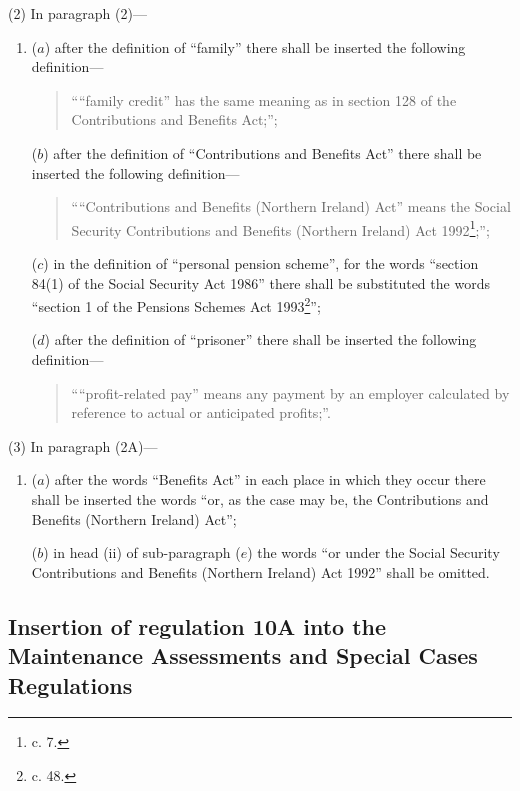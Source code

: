 \documentclass[12pt,a4paper]{article}
\begin{document}
(2) In paragraph (2)—
\begin{enumerate}\item[]
($a$) after the definition of “family” there shall be inserted the following definition—
\begin{quotation}
““family credit” has the same meaning as in section 128 of the Contributions and Benefits Act;”;
\end{quotation}

($b$) after the definition of “Contributions and Benefits Act” there shall be inserted the following definition—
\begin{quotation}
\begin{sloppypar}
““Contributions and Benefits (Northern Ireland) Act” means the Social Security Contributions and Benefits (Northern Ireland) Act 1992\footnote{ c. 7.};”;
\end{sloppypar}
\end{quotation}

($c$) in the definition of “personal pension scheme”, for the words “section 84(1) of the Social Security Act 1986” there shall be substituted the words “section 1 of the Pensions Schemes Act 1993\footnote{ c. 48.}”;

($d$) after the definition of “prisoner” there shall be inserted the following definition—
\begin{quotation}
““profit-related pay” means any payment by an employer calculated by reference to actual or anticipated profits;”.
\end{quotation}
\end{enumerate}

(3) In paragraph (2A)—
\begin{enumerate}\item[]
($a$) after the words “Benefits Act” in each place in which they occur there shall be inserted the words “or, as the case may be, the Contributions and Benefits (Northern Ireland) Act”;

($b$) in head (ii) of sub-paragraph ($e$) the words “or under the Social Security Contributions and Benefits (Northern Ireland) Act 1992” shall be omitted.
\end{enumerate}

\subsection[11. Insertion of regulation 10A into the Maintenance Assessments and Special Cases Regulations]{Insertion of regulation 10A into the Maintenance Assessments and Special Cases Regulations}
\end{document}
